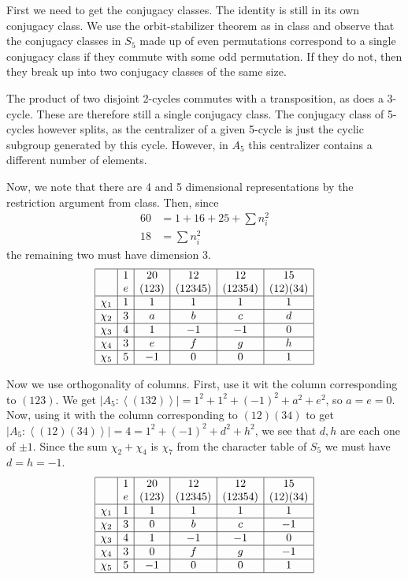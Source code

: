 \documentclass[11pt]{article}
\begin{document}
First we need to get the conjugacy classes. The identity is still in its own conjugacy class. We use the orbit-stabilizer theorem as in class and observe that the conjugacy classes in $S_5$ made up of even permutations correspond to a single conjugacy class if they commute with some odd permutation. If they do not, then they break up into two conjugacy classes of the same size. 

The product of two disjoint 2-cycles commutes with a transposition, as does a 3-cycle. These are therefore still a single conjugacy class. The conjugacy class of  5-cycles however splits, as the centralizer of a given 5-cycle is  just the cyclic subgroup generated by this cycle. However, in $A_5$ this centralizer contains a different number of elements. 


Now, we note that there are 4 and 5 dimensional representations by the restriction argument from class. Then, since 
\begin{align*}
60 &= 1 + 16+25  + \sum n_i^2\\
18 &= \sum n_i^2
\end{align*}
the remaining two must have dimension 3.
\[
\begin{array}{|c|c|c|c|c|c|}
\hline
&1&20&12&12&15\\
&e&(123)&(12345)&(12354)&(12)(34)\\
\hline
\chi_1&1&1&1&1&1\\
\hline
\chi_2&3&a&b&c&d\\
\hline
\chi_3&4&1&-1&-1&0\\
\hline
\chi_4&3&e&f&g&h\\
\hline
\chi_5&5&-1&0&0&1\\
\hline
\end{array}\]

Now we use orthogonality of columns. First, use it wit the column corresponding to $(123)$. We get $|A_5:\left<(132)\right>| = 1^2 + 1^2 +(-1)^2+a^2 + e^2$,  so $a=e=0$. Now, using it with the column corresponding to $(12)(34)$ to get $|A_5:\left<(12)(34)\right>| = 4 = 1^2 + (-1)^2 + d^2 +h^2$, we see that $d, h$ are each one of $\pm1$. Since the sum $\chi_2 + \chi_4$ is $\chi_7$ from the character table of $S_5$ we must have $d=h=-1$.
\[
\begin{array}{|c|c|c|c|c|c|}
\hline
&1&20&12&12&15\\
&e&(123)&(12345)&(12354)&(12)(34)\\
\hline
\chi_1&1&1&1&1&1\\
\hline
\chi_2&3&0&b&c&-1\\
\hline
\chi_3&4&1&-1&-1&0\\
\hline
\chi_4&3&0&f&g&-1\\
\hline
\chi_5&5&-1&0&0&1\\
\hline
\end{array}\]
\end{document}
